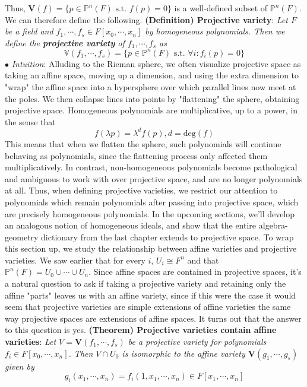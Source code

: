 \documentclass{article}
\newcommand*{\tb}{\textbf}
\newcommand*{\ti}{\textit}
\newcommand*{\nn}{\newline \newline}
\newcommand*{\In}{\indent \ensuremath{\bullet} \textit{Intuition}: }
\newcommand*{\Fx}{\ensuremath{F[x_1, \cdots, x_n]}}
\begin{document}
Thus, $ \mathbf{V}(f) = \{ p \in \mathbb{P}^n(F) \text{ s.t. } f(p) = 0 \} $ is a well-defined subset of $ \mathbb{P}^n(F) $. We can therefore define the following.
\nn
\tb{(Definition) Projective variety}: \ti{Let $ F $ be a field and $ f_1, \cdots, f_s \in F[x_0, \cdots, x_n] $ by homogeneous polynomials. Then we define the \tb{projective variety} of $ f_1, \cdots, f_s $ as}
$$ \mathbb{V}(f_1, \cdots, f_s) = \{ p \in \mathbb{P}^n(F) \text{ s.t. } \forall i: f_i(p) = 0 \} $$
\In Alluding to the Rieman sphere, we often visualize projective space as taking an affine space, moving up a dimension, and using the extra dimension to "wrap" the affine space into a hypersphere over which parallel lines now meet at the poles. We then collapse lines into points by "flattening" the sphere, obtaining projective space. Homogeneous polynomials are multiplicative, up to a power, in the sense that
$$ f(\lambda p) = \lambda^d f(p), d = \text{deg}(f) $$
\indent This means that when we flatten the sphere, such polynomials will continue behaving as polynomials, since the flattening process only affected them multiplicatively. In contrast, non-homogeneous polynomials become pathological and ambiguous to work with over projective space, and are no longer polynomials at all. Thus, when defining projective varieties, we restrict our attention to polynomials which remain polynomials after passing into projective space, which are precisely homogeneous polynomials.
\nn
In the upcoming sections, we'll develop an analogous notion of homogeneous ideals, and show that the entire algebra-geometry dictionary from the last chapter extends to projective space. To wrap this section up, we study the relationship between affine varieties and projective varieties. We saw earlier that for every $ i $, $ U_i \cong F^n $ and that $ \mathbb{P}^n(F) = U_0 \cup \cdots \cup U_n $. Since affine spaces are contained in projective spaces, it's a natural question to ask if taking a projective variety and retaining only the affine "parts" leaves us with an affine variety, since if this were the case it would seem that projective varieties are simple extensions of affine varieties the same way projective spaces are extensions of affine spaces. It turns out that the answer to this question is yes.
\nn
\tb{(Theorem) Projective varieties contain affine varieties}: \ti{Let $ V = \mathbf{V}(f_1, \cdots, f_s) $ be a projective variety for polynomials $ f_i \in F[x_0, \cdots, x_n] $. Then $ V \cap U_0 $ is isomorphic to the affine variety $ \mathbf{V}(g_1, \cdots, g_s) $ given by}
$$ g_i(x_1, \cdots, x_n) = f_i(1, x_1, \cdots, x_n) \in \Fx $$
\end{document}
